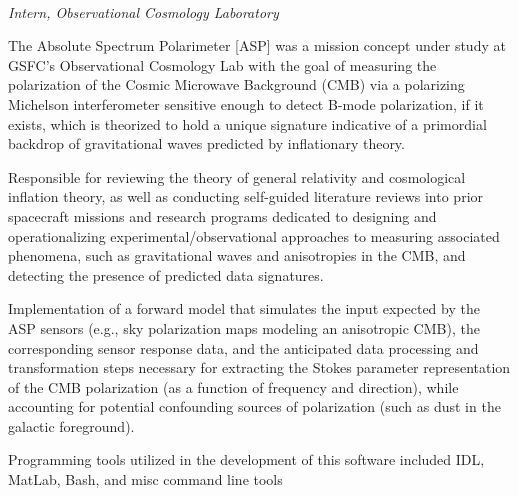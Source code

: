\\  
\vspace{-0.8em}
\textit{Intern, Observational Cosmology Laboratory} 
\begin{itemize*}
  \item The Absolute Spectrum Polarimeter [ASP] was a mission concept
    under study at GSFC's Observational Cosmology Lab with the goal of
    measuring the polarization of the Cosmic Microwave Background (CMB) 
    via a polarizing Michelson interferometer sensitive enough to detect
    B-mode polarization, if it exists, which is theorized to hold a unique
    signature indicative of a primordial backdrop of gravitational waves 
    predicted by inflationary theory.
  \item Responsible for reviewing the theory of general relativity and
    cosmological inflation theory, as well as conducting self-guided
    literature reviews into prior spacecraft missions and research programs
    dedicated to designing and operationalizing experimental/observational
    approaches to measuring associated phenomena, such as gravitational waves
    and anisotropies in the CMB, and detecting the presence of predicted
    data signatures.
  \item Implementation of a forward model that simulates the
    input expected by the ASP sensors (e.g., sky polarization maps
    modeling an anisotropic CMB), the corresponding sensor response
    data, and the anticipated data processing and transformation steps
    necessary for extracting the Stokes parameter representation of
    the CMB polarization (as a function of frequency and direction),
    while accounting for potential confounding sources of polarization
    (such as dust in the galactic foreground).
  \item Programming tools utilized in the development of this
    software included IDL, MatLab, Bash, and misc command line tools
\end{itemize*}

